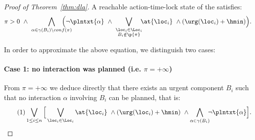 \begin{proof}[Proof of Theorem~\ref{thm:dla}]
A reachable action-time-lock state of the \lpsabr satisfies:
\begin{displaymath}
  \pi>0 \ \wedge \ \bigwedge_{\substack{\alpha \in \gamma(B_i) \setminus conf(\pi)}} \hspace*{-4ex} \Big(\neg\plntxt{\alpha} \ \wedge \ \bigvee_{\substack{\loc_i \in \Loc_i \\ B_i \notin \p{\pi}}} \hspace*{-1ex} \at{\loc_i} \ \wedge(\urg(\loc_i) + \hmin)\Big).
\end{displaymath}

In order to approximate the above equation, we distinguish two cases:
\paragraph*{Case 1: no interaction was planned (i.e. $\pi = +\infty$)\\}
From $\pi = +\infty$ we deduce directly that there exists an urgent component $B_i$ such that no interaction $\alpha$
involving $B_i$ can be planned, that is:
\begin{equation}
  \label{eq:case1}\tag{1}
  \bigvee_{\substack{1\le i\le n}}\Big[\bigvee_{\loc_i \in \Loc_i}\at{\loc_i}\ \wedge(\urg(\loc_i)+\hmin) \ \wedge\bigwedge_{\substack{\alpha \in \gamma(B_i)}} \hspace*{-1ex} \neg\plntxt{\alpha}\Big].
\end{equation}


\end{proof}
